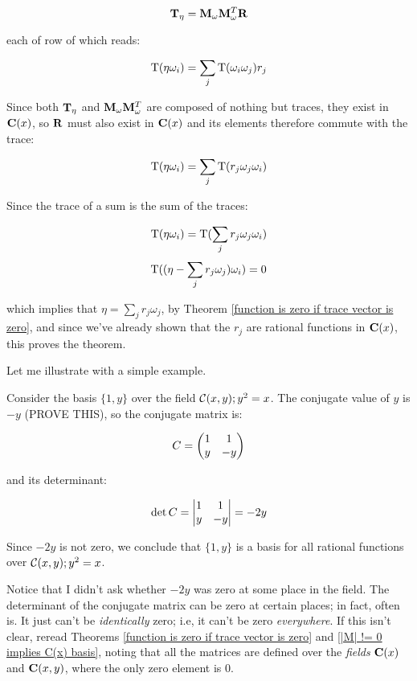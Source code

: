 $${\bf T}_\eta = {\bf M}_\omega {\bf M}_\omega^T {\bf R}$$

each of row of which reads:

$$ {\rm T}(\eta \omega_i) = \sum_j {\rm T}(\omega_i \omega_j) r_j $$

Since both ${\bf T}_\eta$ and ${\bf M}_\omega{\bf M}_\omega^T$ are composed of
nothing but traces, they exist in ${\bf C}(x)$, so ${\bf R}$ must also
exist in ${\bf C}(x)$ and its elements therefore commute with the
trace:

$$ {\rm T}(\eta \omega_i) = \sum_j {\rm T}(r_j \omega_j \omega_i) $$

Since the trace of a sum is the sum of the traces:

$$ {\rm T}(\eta \omega_i) = {\rm T}(\sum_j r_j \omega_j \omega_i) $$
$$ {\rm T}((\eta - \sum_j r_j \omega_j) \omega_i) = 0 $$

which implies that $\eta = \sum_j r_j \omega_j$, by Theorem
\ref{function is zero if trace vector is zero}, and since we've
already shown that the $r_j$ are rational functions in ${\bf C}(x)$,
this proves the theorem.

\endtheorem

Let me illustrate with a simple example.

\example

Consider the basis $\{1, y\}$ over the field ${\cal C}(x,y); y^2=x$.
The conjugate value of $y$ is $-y$ (PROVE THIS), so the conjugate
matrix is:

$$C=\left(\begin{matrix}1&1\cr y&-y\cr\end{matrix}\right)$$

and its determinant:

$$\det C=\left|\begin{matrix}1&1\cr y&-y\cr\end{matrix}\right| = -2y$$

Since $-2y$ is not zero, we conclude that $\{1, y\}$ is a basis
for all rational functions over ${\cal C}(x,y); y^2=x$.

\endexample

Notice that I didn't ask whether $-2y$ was zero at some place in the
field.  The determinant of the conjugate matrix can be zero at certain
places; in fact, often is.  It just can't be {\it identically} zero;
i.e, it can't be zero {\it everywhere}.  If this isn't clear, reread
Theorems \ref{function is zero if trace vector is zero} and \ref{|M|
!= 0 implies C(x) basis}, noting that all the matrices are defined
over the {\it fields} ${\bf C}(x)$ and ${\bf C}(x,y)$, where the only
zero element is 0.


